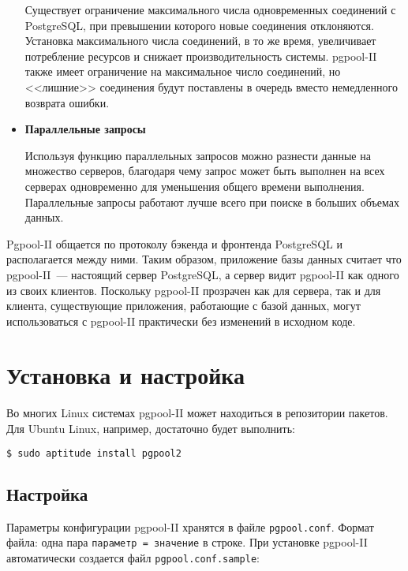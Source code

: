 \begin{itemize}
Существует ограничение максимального числа одновременных соединений с PostgreSQL, при превышении которого новые соединения отклоняются. Установка максимального числа соединений, в то же время, увеличивает потребление ресурсов и снижает производительность системы. pgpool-II также имеет ограничение на максимальное число соединений, но <<лишние>> соединения будут поставлены в очередь вместо немедленного возврата ошибки.

\item \textbf{Параллельные запросы}

Используя функцию параллельных запросов можно разнести данные на множество серверов, благодаря чему запрос может быть выполнен на всех серверах одновременно для уменьшения общего времени выполнения. Параллельные запросы работают лучше всего при поиске в больших объемах данных.

\end{itemize}

Pgpool-II общается по протоколу бэкенда и фронтенда PostgreSQL и располагается между ними. Таким образом, приложение базы данных считает что pgpool-II~--- настоящий сервер PostgreSQL, а сервер видит pgpool-II как одного из своих клиентов. Поскольку pgpool-II прозрачен как для сервера, так и для клиента, существующие приложения, работающие с базой данных, могут использоваться с pgpool-II практически без изменений в исходном коде.


\section{Установка и настройка}

Во многих Linux системах pgpool-II может находиться в репозитории пакетов. Для Ubuntu Linux, например, достаточно будет выполнить:

\begin{lstlisting}[language=Bash,label=lst:pgpool3,caption=Установка pgpool-II]
$ sudo aptitude install pgpool2
\end{lstlisting}

\subsection{Настройка}

Параметры конфигурации pgpool-II хранятся в файле \lstinline!pgpool.conf!. Формат файла: одна пара \lstinline!параметр = значение! в строке. При установке pgpool-II автоматически создается файл \lstinline!pgpool.conf.sample!:

